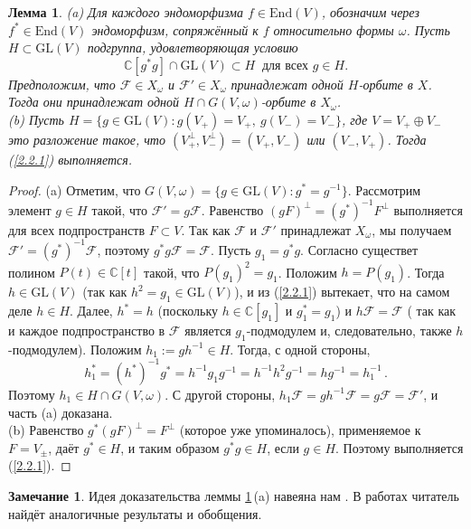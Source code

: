 \documentclass{amsart}
\newtheorem{lemma}{Лемма}
\theoremstyle{definition}
\newtheorem{remark}{Замечание}
\begin{document}
\begin{lemma}
\label{lemma-2.2.1}
{\rm (a)}
Для каждого эндоморфизма  $f\in\mathrm{End}(V)$, обозначим через $f^*\in\mathrm{End}(V)$  эндоморфизм,  сопряжённый к $f$ относительно формы $\omega$.
Пусть $H\subset \mathrm{GL}(V)$ подгруппа, удовлетворяющая условию
\begin{equation}
\label{2.2.1}
\mathbb{C}[g^*g]\cap\mathrm{GL}(V)\subset H\ \mbox{ для всех $g\in H$}.
\end{equation}
Предположим, что $\mathcal{F}\in X_\omega$ и $\mathcal{F}'\in X_\omega$ принадлежат одной $H$-орбите в $X$.  Тогда они принадлежат одной $H\cap G(V,\omega)$-орбите в $X_\omega$. \\
{\rm (b)} Пусть $H=\{g\in \mathrm{GL}(V):g(V_+)=V_+,\ g(V_-)=V_-\}$, где $V=V_+\oplus V_-$ это разложение такое, что
$(V_+^\perp,V_-^\perp)=(V_+,V_-)$ или $(V_-,V_+)$.
Тогда (\ref{2.2.1}) выполняется.
\end{lemma}

\begin{proof}
{\rm (a)}
Отметим, что $G(V,\omega)=\{g\in\mathrm{GL}(V):g^*=g^{-1}\}$.
Рассмотрим элемент $g\in H$ такой, что $\mathcal{F}'=g\mathcal{F}$.
Равенство $(gF)^\perp=(g^*)^{-1}F^\perp$ выполняется для всех подпространств $F\subset V$.
Так как $\mathcal{F}$ и $\mathcal{F}'$ принадлежат $X_\omega$, мы получаем $\mathcal{F}'=(g^*)^{-1}\mathcal{F}$,
поэтому $g^*g\mathcal{F}=\mathcal{F}$.
Пусть $g_1=g^*g$.
Согласно \cite[Лемма 1.5]{Jantzen} существет полином $P(t)\in\mathbb{C}[t]$ такой, что
$P(g_1)^2=g_1$. Положим $h=P(g_1)$.
Тогда $h\in\mathrm{GL}(V)$ (так как $h^2=g_1\in\mathrm{GL}(V)$), и из (\ref{2.2.1}) вытекает, что на самом деле $h\in H$.
Далее, $h^*=h$ (поскольку $h\in\mathbb{C}[g_1]$ и $g_1^*=g_1$)
и $h\mathcal{F}=\mathcal{F}$ ( так как и каждое подпространство в $\mathcal{F}$ является $g_1$-подмодулем и, следовательно, также $h$-подмодулем).
Положим $h_1:=gh^{-1}\in H$.
Тогда, с одной стороны,
\[h_1^*=(h^*)^{-1}g^*=h^{-1}g_1g^{-1}=h^{-1}h^2g^{-1}=hg^{-1}=h_1^{-1}\,.\]
Поэтому $h_1\in H\cap G(V,\omega)$.
С другой стороны,
$h_1\mathcal{F}=gh^{-1}\mathcal{F}=g\mathcal{F}=\mathcal{F}'$, и часть (a) доказана. \\
{\rm (b)}
Равенство  $g^*(gF)^\perp=F^\perp$ (которое уже упоминалось), применяемое к $F=V_\pm$, даёт $g^*\in H$, и таким образом $g^*g\in H$, если $g\in H$. Поэтому выполняется (\ref{2.2.1}).
\end{proof}

\begin{remark}
Идея доказательства леммы  \ref{lemma-2.2.1}\,{\rm (a)} навеяна нам \cite[\S1.4]{Jantzen}. В  работах \cite{Nishiyama, Otha} читатель найдёт аналогичные результаты и обобщения.
\end{remark}
\end{document}
